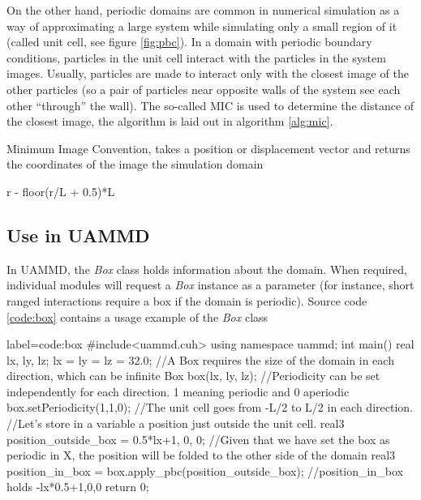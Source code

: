 \documentclass[ twoside,openright,titlepage,numbers=noenddot,%
headinclude,footinclude,cleardoublepage=empty,abstract=on,
BCOR=5mm,paper=b5,fontsize=11pt, dvipsnames
]{scrreprt}
\newcommand{\uammd}{\gls{UAMMD}\xspace}
\begin{document}
On the other hand, periodic domains are common in numerical simulation as a way of approximating a large system while simulating only a small region of it (called unit cell, see figure \ref{fig:pbc}). In a domain with periodic boundary conditions, particles in the unit cell interact with the particles in the system images. Usually, particles are made to interact only with the closest image of the other particles (so a pair of particles near opposite walls of the system see each other ``through'' the wall). The so-called \gls{MIC} is used to determine the distance of the closest image, the algorithm is laid out in algorithm \ref{alg:mic}.

\begin{algorithm}
  \caption{Minimum Image Convention, takes a position or displacement vector and returns the coordinates of the image the simulation domain}
  \label{alg:mic}
  \begin{algorithmic}[1]
    \State \Return r - floor(r/L + 0.5)*L
    \EndFunction
  \end{algorithmic}
\end{algorithm}

\subsection*{Use in UAMMD}
In \uammd, the \emph{Box} class holds information about the domain. When required, individual modules will request a \emph{Box} instance as a parameter (for instance, short ranged interactions require a box if the domain is periodic). Source code \ref{code:box} contains a usage example of the \emph{Box} class
\begin{code2}{label=code:box}
#include<uammd.cuh>
using namespace uammd;
int main(){
  real lx, ly, lz;
  lx = ly = lz = 32.0;
  //A Box requires the size of the domain in each direction, which can be infinite
  Box box({lx, ly, lz});
  //Periodicity can be set independently for each direction. 1 meaning periodic and 0 aperiodic
  box.setPeriodicity(1,1,0);
  //The unit cell goes from -L/2 to L/2 in each direction.
  //Let's store in a variable a position just outside the unit cell.
  real3 position_outside_box = {0.5*lx+1, 0, 0};
  //Given that we have set the box as periodic in X, the position will be folded to the other side of the domain
  real3 position_in_box = box.apply_pbc(position_outside_box);
  //position_in_box holds {-lx*0.5+1,0,0}
  return 0; 
}
\end{code2}
\end{document}
